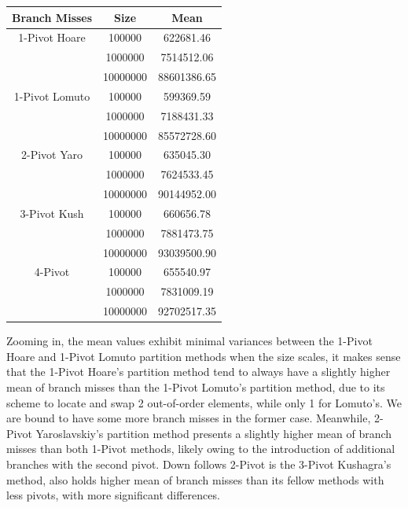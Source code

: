 \documentclass{article}
\begin{document}
\begin{center}
    \small
    \begin{tabular}{ |c c | c | }
        \hline
        Branch Misses   & Size     & Mean         \\
        \hline
        1-Pivot Hoare   & 100000   & 622681.46    \\
                        & 1000000  & 7514512.06   \\
                        & 10000000 & 88601386.65  \\
        \hline
        1-Pivot Lomuto  & 100000   & 599369.59    \\
                        & 1000000  & 7188431.33   \\
                        & 10000000 & 85572728.60  \\
        \hline
        2-Pivot Yaro    & 100000   & 635045.30    \\
                        & 1000000  & 7624533.45   \\
                        & 10000000 & 90144952.00  \\
        \hline
        3-Pivot Kush    & 100000   & 660656.78    \\
                        & 1000000  & 7881473.75   \\
                        & 10000000 & 93039500.90  \\
        \hline
        4-Pivot         & 100000   & 655540.97    \\
                        & 1000000  & 7831009.19   \\
                        & 10000000 & 92702517.35  \\
        \hline
    \end{tabular}
    \end{center}

Zooming in, the mean values exhibit minimal variances between the 1-Pivot Hoare and 1-Pivot Lomuto partition methods when the size scales,
it makes sense that the 1-Pivot Hoare's partition method tend to always have a slightly higher mean of branch misses than the 1-Pivot Lomuto's partition method, due to its scheme to locate and swap 2 out-of-order elements, while only 1 for Lomuto's.
We are bound to have some more branch misses in the former case. Meanwhile, 2-Pivot Yaroslavskiy's partition method presents a slightly higher mean of branch misses than both 1-Pivot methods, likely owing to the introduction of additional branches with the second pivot.
Down follows 2-Pivot is the 3-Pivot Kushagra's method, also holds higher mean of branch misses than its fellow methods with less pivots, with more significant differences.
\end{document}
